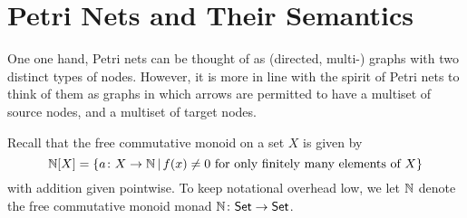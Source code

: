\section{Petri Nets and Their Semantics}
\label{sec:petri}

One one hand, Petri nets can be thought of as (directed, multi-) graphs with two distinct types of nodes. However, it is more in line with the spirit  of Petri nets to think of them as graphs in which arrows are permitted to have a multiset of source nodes, and a multiset of target nodes. 


Recall that the free commutative monoid on a set $X$ is given by 
\[
    \mathbb{N}[X]  = \{ a \colon X \to \mathbb{N} \, | \, f(x) \neq 0 \text{ for only finitely many elements of } X \} 
\]
with addition given pointwise.
To keep notational overhead low, we let $\mathbb{N}$ denote the free commutative monoid monad $\mathbb{N} \colon \mathsf{Set} \to \mathsf{Set}$.





